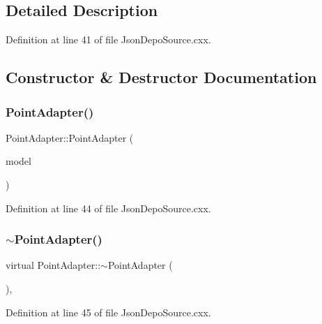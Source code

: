 \subsection{Detailed Description}


Definition at line 41 of file Json\+Depo\+Source.\+cxx.



\subsection{Constructor \& Destructor Documentation}
\mbox{\label{class_point_adapter_a67f1e668f0292b46c61b8e2fd83aa90f}} 
\subsubsection{\texorpdfstring{Point\+Adapter()}{PointAdapter()}}
{\footnotesize\ttfamily Point\+Adapter\+::\+Point\+Adapter (\begin{DoxyParamCaption}\item[{I\+Recombination\+Model\+::pointer}]{model }\end{DoxyParamCaption})\hspace{0.3cm}{\ttfamily [inline]}}



Definition at line 44 of file Json\+Depo\+Source.\+cxx.

\mbox{\label{class_point_adapter_a073ab03b01eea2e7f467136077d8c06a}} 
\subsubsection{\texorpdfstring{$\sim$\+Point\+Adapter()}{~PointAdapter()}}
{\footnotesize\ttfamily virtual Point\+Adapter\+::$\sim$\+Point\+Adapter (\begin{DoxyParamCaption}{ }\end{DoxyParamCaption})\hspace{0.3cm}{\ttfamily [inline]}, {\ttfamily [virtual]}}



Definition at line 45 of file Json\+Depo\+Source.\+cxx.



